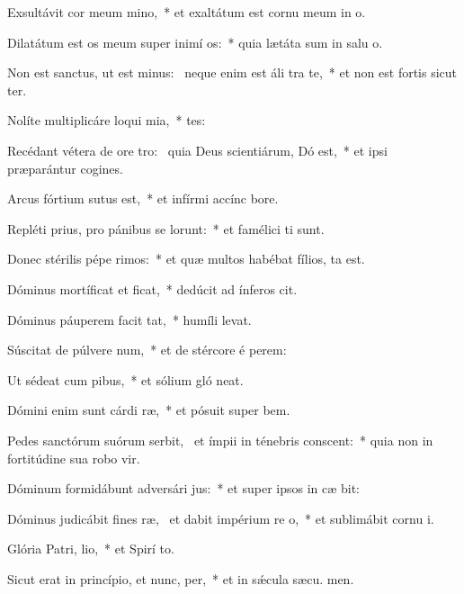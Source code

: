 \item Exsultávit cor meum  mino,~* et exaltátum est cornu meum in  o.
\item Dilatátum est os meum super inimí os:~* quia lætáta sum in salu o.
\item Non est sanctus, ut est minus:~\pscross{} neque enim est áli tra te,~* et non est fortis sicut  ter.
\item Nolíte multiplicáre loqui mia,~* tes:
\item Recédant vétera de ore tro:~\pscross{} quia Deus scientiárum, Dó est,~* et ipsi præparántur cogines.
\item Arcus fórtium sutus est,~* et infírmi accínc  bore.
\item Repléti prius, pro pánibus se lorunt:~* et famélici ti sunt.
\item Donec stérilis pépe rimos:~* et quæ multos habébat fílios, ta est.
\item Dóminus mortíficat et ficat,~* dedúcit ad ínferos  cit.
\item Dóminus páuperem facit  tat,~* humíli  levat.
\item Súscitat de púlvere num,~* et de stércore é perem:
\item Ut sédeat cum pibus,~* et sólium gló neat.
\item Dómini enim sunt cárdi ræ,~* et pósuit super  bem.
\item Pedes sanctórum suórum serbit,~\pscross{} et ímpii in ténebris conscent:~* quia non in fortitúdine sua robo vir.
\item Dóminum formidábunt adversári jus:~* et super ipsos in cæ bit:
\item Dóminus judicábit fines ræ,~\pscross{} et dabit impérium re o,~* et sublimábit cornu  i.
\item Glória Patri,  lio,~* et Spirí to.
\item Sicut erat in princípio, et nunc,  per,~* et in sǽcula sæcu. men.
